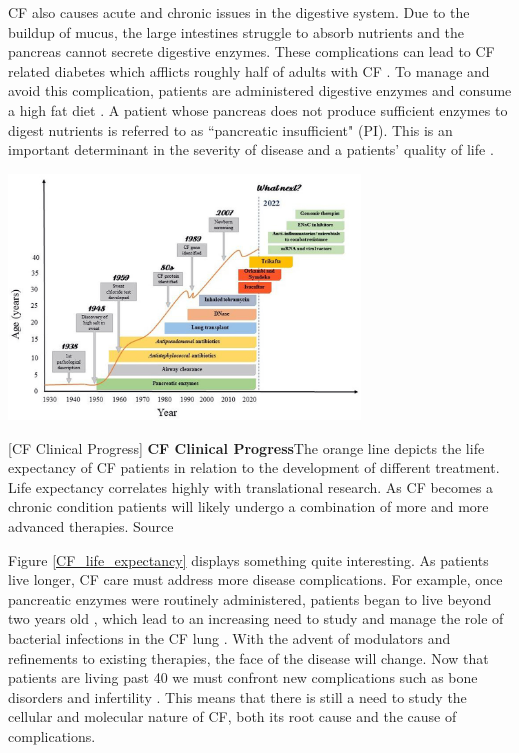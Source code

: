 CF also causes acute and chronic issues in the digestive system. Due to the buildup of mucus, the large intestines struggle to absorb nutrients and the pancreas cannot secrete digestive enzymes. These complications can lead to CF related diabetes which afflicts roughly half of adults with CF \cite{Kayani2018}. To manage and avoid this complication, patients are administered digestive enzymes and consume a high fat diet \cite{sullivan2017}. A patient whose pancreas does not produce sufficient enzymes to digest nutrients is referred to as ``pancreatic insufficient" (PI). This is an important determinant in the severity of disease and a patients' quality of life \cite{halloran2011,singh2017}. 

\begin{center}
\includegraphics[width=0.7\textwidth]{figures/CF_life_expectancy.png}
\end{center}
\captionsetup{singlelinecheck = false, justification=raggedright}
\begingroup
{}[CF Clinical Progress] {\textbf{CF Clinical Progress}}{The orange line depicts the life expectancy of CF patients in relation to the development of different treatment. Life expectancy correlates highly with translational research. As CF becomes a chronic condition patients will likely undergo a combination of more and more advanced therapies. Source \cite{garcia2022}} 
\label{CF_life_expectancy}
\endgroup

Figure \ref{CF_life_expectancy} displays something quite interesting. As patients live longer, CF care must address more disease complications. For example, once pancreatic enzymes were routinely administered, patients began to live beyond two years old \cite{roberts1957, levy2011}, which lead to an increasing need to study and manage the role of bacterial infections in the CF lung \cite{burns2001}. With the advent of modulators and refinements to existing therapies, the face of the disease will change. Now that patients are living past 40 we must confront new complications such as bone disorders and infertility \cite{stalvey2013, popli2007}. This means that there is still a need to study the cellular and molecular nature of CF, both its root cause and the cause of complications. 


